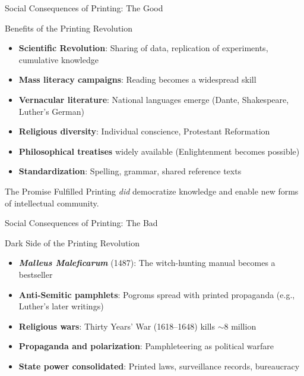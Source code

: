 \documentclass[aspectratio=169,11pt]{beamer}
\begin{document}
\begin{frame}{Social Consequences of Printing: The Good}
\begin{block}{\faThumbsUp\hspace{0.3em}Benefits of the Printing Revolution}
\begin{itemize}
  \item \textbf{Scientific Revolution}: Sharing of data, replication of experiments, cumulative knowledge
  \item \textbf{Mass literacy campaigns}: Reading becomes a widespread skill
  \item \textbf{Vernacular literature}: National languages emerge (Dante, Shakespeare, Luther's German)
  \item \textbf{Religious diversity}: Individual conscience, Protestant Reformation
  \item \textbf{Philosophical treatises} widely available (Enlightenment becomes possible)
  \item \textbf{Standardization}: Spelling, grammar, shared reference texts
\end{itemize}
\end{block}

\vspace{0.3em}
\begin{exampleblock}{The Promise Fulfilled}
Printing \textit{did} democratize knowledge and enable new forms of intellectual community.
\end{exampleblock}
\end{frame}

\begin{frame}{Social Consequences of Printing: The Bad}
\begin{alertblock}{\faThumbsDown\hspace{0.3em}Dark Side of the Printing Revolution}
\begin{itemize}
  \item \textbf{\textit{Malleus Maleficarum}} (1487): The witch-hunting manual becomes a bestseller
  \item \textbf{Anti-Semitic pamphlets}: Pogroms spread with printed propaganda (e.g., Luther's later writings)
  \item \textbf{Religious wars}: Thirty Years' War (1618--1648) kills $\sim$8 million
  \item \textbf{Propaganda and polarization}: Pamphleteering as political warfare
  \item \textbf{State power consolidated}: Printed laws, surveillance records, bureaucracy
\end{itemize}
\end{alertblock}

\vspace{0.3em}
\end{frame}
\end{document}
